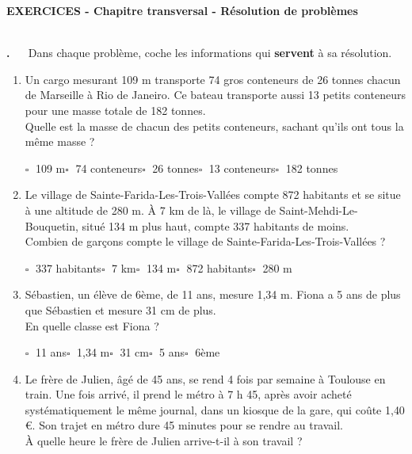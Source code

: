 \documentclass[10pt,a4paper]{article}
\newcounter{exo}
\newcommand{\exo}[1][]{%
  \refstepcounter{exo}%
  \textbf{\textcolor{Couleur8}{\\[0.3cm]\theexo.}}%
  \if\relax\detokenize{#1}\relax\else\ \textbf{#1}\fi\ %
}
\begin{document}
\begin{Large}\textbf{\textcolor{Couleur8}{EXERCICES - Chapitre transversal - Résolution de problèmes}} \end{Large}



\exo Dans chaque problème, coche les informations qui \textbf{servent} à sa résolution.

\begin{enumerate}[itemsep=2em]
	\item Un cargo mesurant 109 m transporte 74 gros conteneurs de 26 tonnes chacun de Marseille à Rio de Janeiro. Ce bateau transporte aussi 13 petits conteneurs pour une masse totale de 182 tonnes.\\Quelle est la masse de chacun des petits conteneurs, sachant qu'ils ont tous la même masse ? 
    
    	$\square\;$ 109 m\qquad $\square\;$ 74 conteneurs\qquad $\square\;$ 26 tonnes\qquad $\square\;$ 13 conteneurs\qquad $\square\;$ 182 tonnes\qquad 
	\item Le village de Sainte-Farida-Les-Trois-Vallées compte 872 habitants et se situe à une altitude de 280 m. À 7 km de là, le village de Saint-Mehdi-Le-Bouquetin, situé 134 m plus haut, compte 337 habitants de moins.\\Combien de garçons compte le village de Sainte-Farida-Les-Trois-Vallées ? 
    
    	$\square\;$ 337 habitants\qquad $\square\;$ 7 km\qquad $\square\;$ 134 m\qquad $\square\;$ 872 habitants\qquad $\square\;$ 280 m\qquad 
	\item Sébastien, un élève de 6ème, de 11 ans, mesure 1,34 m. Fiona a 5 ans de plus que Sébastien et mesure 31 cm de plus.\\En quelle classe est Fiona ? 
    
    	$\square\;$ 11 ans\qquad $\square\;$ 1,34 m\qquad $\square\;$ 31 cm\qquad $\square\;$ 5 ans\qquad $\square\;$ 6ème\qquad 
	\item Le frère de Julien, âgé de 45 ans, se rend 4 fois par semaine à Toulouse en train. Une fois arrivé, il prend le métro à 7 h 45, après avoir acheté systématiquement le même journal, dans un kiosque de la gare, qui coûte 1,40 €. Son trajet en métro dure 45 minutes pour se rendre au travail.\\À quelle heure le frère de Julien arrive-t-il à son travail ? 
    

\end{enumerate}
\end{document}
